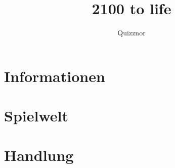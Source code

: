 \documentclass{include/protokollclass}
\title{2100 to life}
\author{Quizznor}
\begin{document}
\maketitle
\tableofcontents

\chapter{Informationen}


\chapter{Spielwelt}


\chapter{Handlung}

\end{document}
